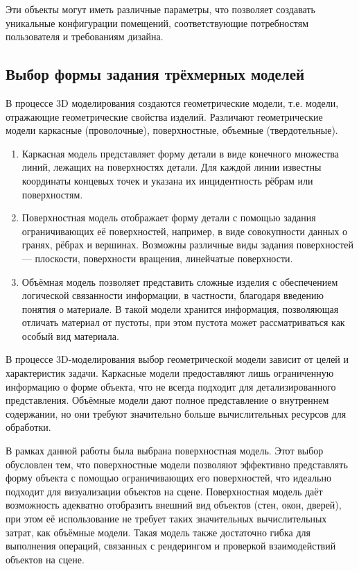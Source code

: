 Эти объекты могут иметь различные параметры, что позволяет создавать уникальные конфигурации помещений, соответствующие потребностям пользователя и требованиям дизайна.



\subsection{Выбор формы задания трёхмерных моделей}

\hspace{1.25cm}
В процессе 3D моделирования создаются геометрические модели, т.е. модели, отражающие геометрические свойства изделий. Различают геометрические модели каркасные (проволочные), поверхностные, объемные (твердотельные).

\begin{enumerate}
\item Каркасная модель представляет форму детали в виде конечного множества линий, лежащих на поверхностях детали. Для каждой линии известны координаты концевых точек и указана их инцидентность рёбрам или поверхностям.

\item Поверхностная модель отображает форму детали с помощью задания ограничивающих её поверхностей, например, в виде совокупности данных о гранях, рёбрах и вершинах. Возможны различные виды задания поверхностей — плоскости, поверхности вращения, линейчатые поверхности.

\item Объёмная модель позволяет представить сложные изделия с обеспечением логической связанности информации, в частности, благодаря введению понятия о материале. В такой модели хранится информация, позволяющая отличать материал от пустоты, при этом пустота может рассматриваться как особый вид материала.~\cite{kgau}
\end{enumerate}

В процессе 3D-моделирования выбор геометрической модели зависит от целей и характеристик задачи. Каркасные модели предоставляют лишь ограниченную информацию о форме объекта, что не всегда подходит для детализированного представления. Объёмные модели дают полное представление о внутреннем содержании, но они требуют значительно больше вычислительных ресурсов для обработки.

В рамках данной работы была выбрана поверхностная модель. Этот выбор обусловлен тем, что поверхностные модели позволяют эффективно представлять форму объекта с помощью ограничивающих его поверхностей, что идеально подходит для визуализации объектов на сцене. Поверхностная модель даёт возможность адекватно отобразить внешний вид объектов (стен, окон, дверей), при этом её использование не требует таких значительных вычислительных затрат, как объёмные модели. Такая модель также достаточно гибка для выполнения операций, связанных с рендерингом и проверкой взаимодействий объектов на сцене.



